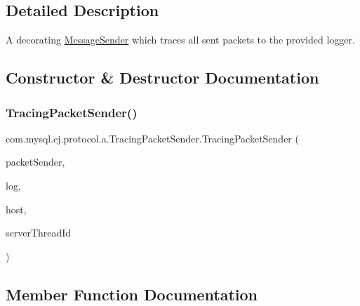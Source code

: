 \subsection{Detailed Description}
A decorating \mbox{\hyperlink{interfacecom_1_1mysql_1_1cj_1_1protocol_1_1_message_sender}{Message\+Sender}} which traces all sent packets to the provided logger. 

\subsection{Constructor \& Destructor Documentation}
\mbox{\label{classcom_1_1mysql_1_1cj_1_1protocol_1_1a_1_1_tracing_packet_sender_a01a618aba9572be7d375093b4984a827}} 
\subsubsection{\texorpdfstring{Tracing\+Packet\+Sender()}{TracingPacketSender()}}
{\footnotesize\ttfamily com.\+mysql.\+cj.\+protocol.\+a.\+Tracing\+Packet\+Sender.\+Tracing\+Packet\+Sender (\begin{DoxyParamCaption}\item[{\mbox{\hyperlink{interfacecom_1_1mysql_1_1cj_1_1protocol_1_1_message_sender}{Message\+Sender}}$<$ \mbox{\hyperlink{classcom_1_1mysql_1_1cj_1_1protocol_1_1a_1_1_native_packet_payload}{Native\+Packet\+Payload}} $>$}]{packet\+Sender,  }\item[{\mbox{\hyperlink{interfacecom_1_1mysql_1_1cj_1_1log_1_1_log}{Log}}}]{log,  }\item[{String}]{host,  }\item[{long}]{server\+Thread\+Id }\end{DoxyParamCaption})}



\subsection{Member Function Documentation}
\mbox{\label{classcom_1_1mysql_1_1cj_1_1protocol_1_1a_1_1_tracing_packet_sender_addcfce3e7ea16adf7933a367fb8f5904}} 
